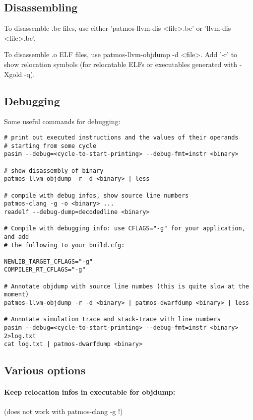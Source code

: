 \subsection{Disassembling}

To disassemble .bc files, use either 'patmos-llvm-dis <file>.bc' or 'llvm-dis <file>.bc'.

To disassemble .o ELF files, use patmos-llvm-objdump -d <file>. Add '-r' to show relocation symbols
(for relocatable ELFs or executables generated with -Xgold -q).

\subsection{Debugging}

Some useful commands for debugging:

\begin{verbatim}
# print out executed instructions and the values of their operands
# starting from some cycle
pasim --debug=<cycle-to-start-printing> --debug-fmt=instr <binary>

# show disassembly of binary
patmos-llvm-objdump -r -d <binary> | less

# compile with debug infos, show source line numbers
patmos-clang -g -o <binary> ...
readelf --debug-dump=decodedline <binary>

# Compile with debugging info: use CFLAGS="-g" for your application, and add
# the following to your build.cfg:

NEWLIB_TARGET_CFLAGS="-g"
COMPILER_RT_CFLAGS="-g"

# Annotate objdump with source line numbes (this is quite slow at the moment)
patmos-llvm-objdump -r -d <binary> | patmos-dwarfdump <binary> | less

# Annotate simulation trace and stack-trace with line numbers
pasim --debug=<cycle-to-start-printing> --debug-fmt=instr <binary> 2>log.txt
cat log.txt | patmos-dwarfdump <binary>
\end{verbatim}

\subsection{Various options}

\paragraph{Keep relocation infos in executable for objdump:} (does not work with patmos-clang -g !)

